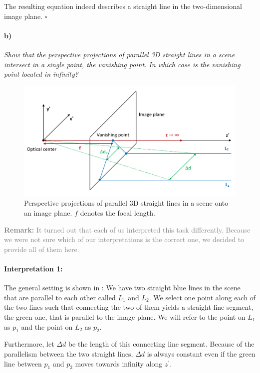 \documentclass[a4paper,twocolumn]{article}
\newcommand{\subtask}[2]{\paragraph{#1)} \textit{#2} \newline}
\begin{document}
	The resulting equation indeed describes a straight line in the two-dimensional image plane. \hfill $\square$
	
	\subtask{b}{Show that the perspective projections of parallel 3D straight lines in a scene intersect in a single point, the vanishing point. In which case is the vanishing point located in infinity?}
	
	
	\begin{figure}
		\centering
		\includegraphics[width=\textwidth]{vanishing_point.png}
		\caption{Perspective projections of parallel 3D straight lines in a scene onto an image plane. $f$ denotes the focal length.}
		\label{fig:vanishing_point}
	\end{figure}
	
	\textcolor{gray}{\textbf{Remark:} It turned out that each of us interpreted this task differently. Because we were not sure which of our interpretations is the correct one, we decided to provide all of them here.}
	
	\paragraph{Interpretation 1:} The general setting is shown in : We have two straight blue lines in the scene that are parallel to each other called $L_1$ and $L_2$. We select one point along each of the two lines such that connecting the two of them yields a straight line segment, the green one, that is parallel to the image plane. We will refer to the point on $L_1$ as $p_1$ and the point on $L_2$ as $p_2$.
	
	Furthermore, let $\Delta d$ be the length of this connecting line segment. Because of the parallelism between the two straight lines, $\Delta d$ is always constant even if the green line between $p_1$ and $p_2$ moves towards infinity along $z^{\prime}$.
	
\end{document}
